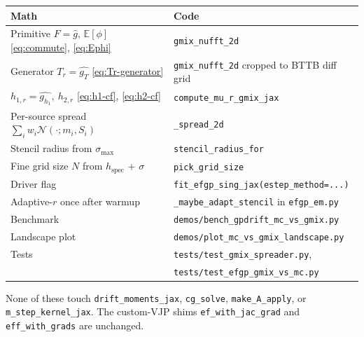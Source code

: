 \documentclass[11pt]{article}
\newcommand{\E}{\mathbb{E}}
\newcommand{\code}[1]{\texttt{\small #1}}
\begin{document}
\noindent
\begin{tabular}{ll}
\toprule
Math & Code \\
\midrule
Primitive $F=\widehat g$, $\E[\phi]$ \eqref{eq:commute}, \eqref{eq:Ephi}
& \code{gmix\_nufft\_2d} \\
Generator $T_r=\widehat{g_T}$ \eqref{eq:Tr-generator}
& \code{gmix\_nufft\_2d} cropped to BTTB diff grid \\
$h_{1,r}=\widehat{g_{h_1}},\ h_{2,r}$ \eqref{eq:h1-cf}, \eqref{eq:h2-cf}
& \code{compute\_mu\_r\_gmix\_jax} \\
Per-source spread $\sum_i w_i \mathcal{N}(\cdot; m_i, S_i)$
& \code{\_spread\_2d} \\
Stencil radius from $\sigma_{\max}$
& \code{stencil\_radius\_for} \\
Fine grid size $N$ from $h_{\text{spec}}$ + $\sigma$
& \code{pick\_grid\_size} \\
Driver flag
& \code{fit\_efgp\_sing\_jax(estep\_method=...)} \\
Adaptive-$r$ once after warmup
& \code{\_maybe\_adapt\_stencil} in \code{efgp\_em.py} \\
Benchmark
& \code{demos/bench\_gpdrift\_mc\_vs\_gmix.py} \\
Landscape plot
& \code{demos/plot\_mc\_vs\_gmix\_landscape.py} \\
Tests
& \code{tests/test\_gmix\_spreader.py},\\
& \code{tests/test\_efgp\_gmix\_vs\_mc.py} \\
\bottomrule
\end{tabular}

\medskip
\noindent
None of these touch \code{drift\_moments\_jax}, \code{cg\_solve},
\code{make\_A\_apply}, or \code{m\_step\_kernel\_jax}.  The custom-VJP
shims \code{ef\_with\_jac\_grad} and \code{eff\_with\_grads} are
unchanged.
\end{document}
